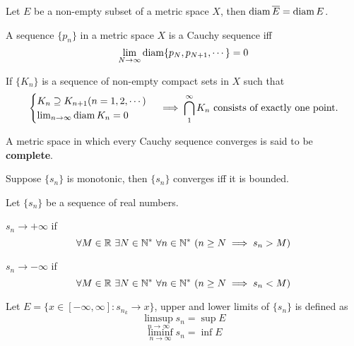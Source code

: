     \begin{theo}
        Let $E$ be a non-empty subset of a metric space $X$, then $\operatorname{diam} \overline{E} = \operatorname{diam} E$. 
    \end{theo}

    \begin{theo}
        A sequence $\{p_n\}$ in a metric space $X$ is a Cauchy sequence iff
        \begin{equation}
            \lim_{N \to \infty} \operatorname{diam} \{ p_N, p_{N+1}, \cdots \} = 0
        \end{equation}
    \end{theo}

    \begin{theo}
        If $\{K_n\}$ is a sequence of non-empty compact sets in $X$ such that 
        \begin{equation}
            \begin{cases}
                K_n \supseteq K_{n+1} (n=1,2,\cdots) \\
                \lim_{n \to \infty} \operatorname{diam} K_n = 0 
            \end{cases}
            \implies \text{$\bigcap_1^\infty K_n$ consists of exactly one point.}
        \end{equation} 
    \end{theo}

    \begin{defi}
        A metric space in which every Cauchy sequence converges is said to be \textbf{complete}.
    \end{defi}

    \begin{theo}
        Suppose $\{s_n\}$ is monotonic, then $\{s_n\}$ converges iff it is bounded.
    \end{theo}

    \begin{defi}
        Let $\{s_n\}$ be a sequence of real numbers. 
        
        $s_n \to +\infty$ if
        \begin{equation}
            \forall M \in \R \ \exists N \in \N^* \ \forall n \in \N^* \ (n \geq N \implies s_n > M)
        \end{equation}

        $s_n \to -\infty$ if
        \begin{equation}
            \forall M \in \R \ \exists N \in \N^* \ \forall n \in \N^* \ (n \geq N \implies s_n < M)
        \end{equation}

        Let $E = \{ x \in [-\infty, \infty] : s_{n_k} \to x \}$, upper and lower limits of $\{s_n\}$ is defined as
        \begin{equation}
            \limsup_{n \to \infty} s_n = \sup E
        \end{equation}
        \begin{equation}
            \liminf_{n \to \infty} s_n = \inf E
        \end{equation}
    \end{defi}

